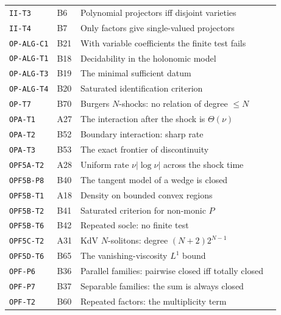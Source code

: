 \documentclass[11pt,a4paper,oneside]{report}
\begin{document}
\begin{center}
\begin{longtable}{@{}L{3.0cm}L{1.2cm}L{8.4cm}L{1.2cm}@{}}
\texttt{II-T3} & B6 & Polynomial projectors iff disjoint varieties & \pageref{dim:II-T3}\\
\texttt{II-T4} & B7 & Only factors give single-valued projectors & \pageref{dim:II-T4}\\
\texttt{OP-ALG-C1} & B21 & With variable coefficients the finite test fails & \pageref{dim:OP-ALG-C1}\\
\texttt{OP-ALG-T1} & B18 & Decidability in the holonomic model & \pageref{dim:OP-ALG-T1}\\
\texttt{OP-ALG-T3} & B19 & The minimal sufficient datum & \pageref{dim:OP-ALG-T3}\\
\texttt{OP-ALG-T4} & B20 & Saturated identification criterion & \pageref{dim:OP-ALG-T4}\\
\texttt{OP-T7} & B70 & Burgers $N$-shocks: no relation of degree $\le N$ & \pageref{dim:OP-T7}\\
\texttt{OPA-T1} & A27 & The interaction after the shock is $\Theta(\nu)$ & \pageref{dim:OPA-T1}\\
\texttt{OPA-T2} & B52 & Boundary interaction: sharp rate & \pageref{dim:OPA-T2}\\
\texttt{OPA-T3} & B53 & The exact frontier of discontinuity & \pageref{dim:OPA-T3}\\
\texttt{OPF5A-T2} & A28 & Uniform rate $\nu|\log\nu|$ across the shock time & \pageref{dim:OPF5A-T2}\\
\texttt{OPF5B-P8} & B40 & The tangent model of a wedge is closed & \pageref{dim:OPF5B-P8}\\
\texttt{OPF5B-T1} & A18 & Density on bounded convex regions & \pageref{dim:OPF5B-T1}\\
\texttt{OPF5B-T2} & B41 & Saturated criterion for non-monic $P$ & \pageref{dim:OPF5B-T2}\\
\texttt{OPF5B-T6} & B42 & Repeated socle: no finite test & \pageref{dim:OPF5B-T6}\\
\texttt{OPF5C-T2} & A31 & KdV $N$-solitons: degree $(N+2)2^{N-1}$ & \pageref{dim:OPF5C-T2}\\
\texttt{OPF5D-T6} & B65 & The vanishing-viscosity $L^1$ bound & \pageref{dim:OPF5D-T6}\\
\texttt{OPF-P6} & B36 & Parallel families: pairwise closed iff totally closed & \pageref{dim:OPF-P6}\\
\texttt{OPF-P7} & B37 & Separable families: the sum is always closed & \pageref{dim:OPF-P7}\\
\texttt{OPF-T2} & B60 & Repeated factors: the multiplicity term & \pageref{dim:OPF-T2}\\

\end{longtable}
\end{center}
\end{document}

